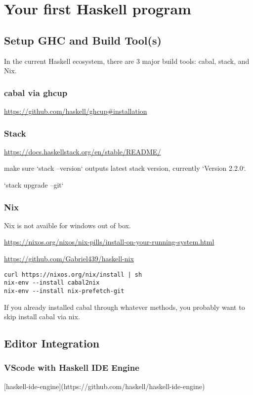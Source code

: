 \chapter{Your first Haskell program}

\section{Setup GHC and Build Tool(s)}

In the current Haskell ecosystem, there are 3 major build tools: cabal, stack, and Nix.
\subsection{cabal via ghcup}
\url{https://github.com/haskell/ghcup#installation}

\subsection{Stack}

\url{https://docs.haskellstack.org/en/stable/README/}

make sure `stack --version` outputs latest stack version, currently `Version 2.2.0`.

`stack upgrade --git`
\subsection{Nix}
Nix is not avaible for windows out of box.

\url{https://nixos.org/nixos/nix-pills/install-on-your-running-system.html}

\url{https://github.com/Gabriel439/haskell-nix}
\begin{verbatim}
curl https://nixos.org/nix/install | sh
nix-env --install cabal2nix
nix-env --install nix-prefetch-git
\end{verbatim}

If you already installed cabal through whatever methods, you probably want to skip install cabal via nix.

\section{Editor Integration}
\subsection{VScode with Haskell IDE Engine}
[haskell-ide-engine](https://github.com/haskell/haskell-ide-engine)

